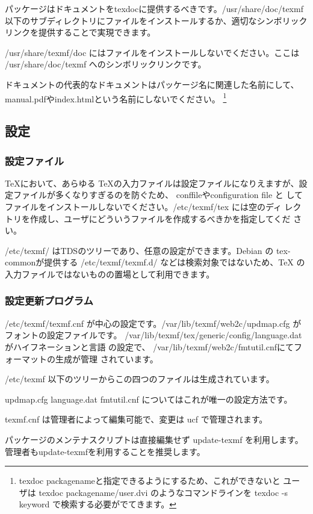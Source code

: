\documentclass[mingoth,a4paper]{jsarticle}
\begin{document}
パッケージはドキュメントをtexdocに提供するべきです。/usr/share/doc/texmf 
以下のサブディレクトリにファイルをインストールするか、適切なシンボリック
リンクを提供することで実現できます。

/usr/share/texmf/doc にはファイルをインストールしないでください。ここは 
/usr/share/doc/texmf へのシンボリックリンクです。

ドキュメントの代表的なドキュメントはパッケージ名に関連した名前にして、
manual.pdfやindex.htmlという名前にしないでください。
\footnote{texdoc packagenameと指定できるようにするため、これができないと
ユーザは texdoc packagename/user.dvi のようなコマンドラインを texdoc -s
keyword で検索する必要がでてきます。}

\subsection{設定}
\subsubsection{設定ファイル}

\TeX において、あらゆる \TeX の入力ファイルは設定ファイルになりえますが、設
定ファイルが多くなりすぎるのを防ぐため、 conffileやconfiguration file と
してファイルをインストールしないでください。/etc/texmf/tex には空のディ
レクトリを作成し、ユーザにどういうファイルを作成するべきかを指定してくだ
さい。

/etc/texmf/ はTDSのツリーであり、任意の設定ができます。Debian の 
tex-commonが提供する /etc/texmf/texmf.d/ などは検索対象ではないため、\TeX
の入力ファイルではないものの置場として利用できます。

\subsubsection{設定更新プログラム}

 /etc/texmf/texmf.cnf が中心の設定です。/var/lib/texmf/web2c/updmap.cfg 
がフォントの設定ファイルです。
/var/lib/texmf/tex/generic/config/language.dat がハイフネーションと言語
の設定で、 /var/lib/texmf/web2c/fmtutil.cnfにてフォーマットの生成が管理
されています。

/etc/texmf 以下のツリーからこの四つのファイルは生成されています。

updmap.cfg language.dat fmtutil.cnf についてはこれが唯一の設定方法です。

texmf.cnf は管理者によって編集可能で、変更は ucf で管理されます。

パッケージのメンテナスクリプトは直接編集せず update-texmf を利用します。
管理者もupdate-texmfを利用することを推奨します。
\end{document}
